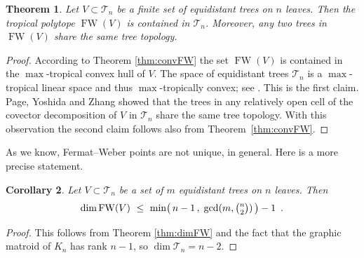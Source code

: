 \documentclass[a4paper,12pt]{amsart}
\newcommand\cT{{\mathcal T}}
\DeclareMathOperator{\FW}{FW} %
\newtheorem{theorem}{Theorem}
\newtheorem{corollary}[theorem]{Corollary}
\theoremstyle{remark}
\begin{document}
\begin{theorem} \label{thm:trop_consensus}
  Let $V\subset\cT_n$ be a finite set of equidistant trees on $n$ leaves.
  Then the tropical polytope $\FW(V)$ is contained in $\cT_n$.
  Moreover, any two trees in $\FW(V)$ share the same tree topology.
\end{theorem}

\begin{proof}
  According to Theorem \ref{thm:convFW} the set $\FW(V)$ is contained in the $\max$-tropical convex hull of $V$.
  The space of equidistant trees $\cT_n$ is a $\max$-tropical linear space and thus $\max$-tropically convex; see \cite[Proposition 10.33]{ETC}.
  This is the first claim.
  Page, Yoshida and Zhang showed \cite[Theorem~3.2]{Page+Yoshida+Zhang:2020} that the trees in any relatively open cell of the covector decomposition of $V$ in $\cT_n$ share the same tree topology.
  With this observation the second claim follows also from Theorem~\ref{thm:convFW}.
\end{proof}

As we know, Fermat--Weber points are not unique, in general.
Here is a more precise statement.

\begin{corollary} \label{cor:trop_consensus}
  Let $V\subset\cT_n$ be a set of $m$ equidistant trees on $n$ leaves.
  Then
  \[
    \dim\FW(V) \ \leq \ \min\bigl(\, n-1 \,,\; \gcd(m,\tbinom{n}{2}) \,\bigr)-1 \enspace.
  \]
\end{corollary}

\begin{proof}
  This follows from Theorem \ref{thm:dimFW} and the fact that the graphic matroid of $K_n$ has rank $n-1$, so $\dim\cT_n= n-2$.
\end{proof}
\end{document}
